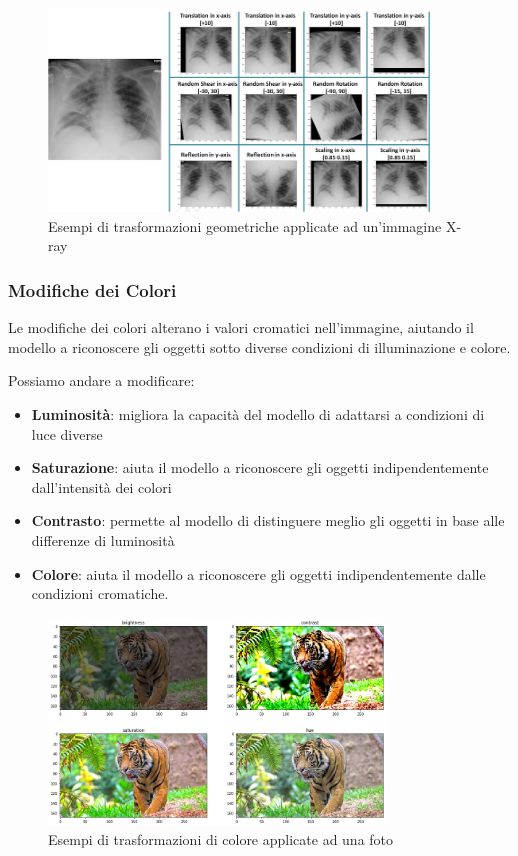 \begin{figure}[ht]
    \centering
    \includegraphics[width=0.9\textwidth]{files/capitoli/3-data-augmentation/assets/geometric-transformations.png}
    \caption{\label{fig:geometric-transformations}Esempi di trasformazioni geometriche applicate ad un'immagine X-ray\cite{34}}
\end{figure}

\subsubsection{Modifiche dei Colori}
Le modifiche dei colori alterano i valori cromatici nell'immagine, aiutando il modello a riconoscere gli oggetti sotto diverse condizioni di illuminazione e colore.

Possiamo andare a modificare:
\begin{itemize}
  \item \textbf{Luminosità}: migliora la capacità del modello di adattarsi a condizioni di luce diverse
  \item \textbf{Saturazione}: aiuta il modello a riconoscere gli oggetti indipendentemente dall'intensità dei colori
  \item \textbf{Contrasto}: permette al modello di distinguere meglio gli oggetti in base alle differenze di luminosità
  \item \textbf{Colore}: aiuta il modello a riconoscere gli oggetti indipendentemente dalle condizioni cromatiche.
\end{itemize}

\begin{figure}[ht]
    \centering
    \includegraphics[width=0.8\textwidth]{files/capitoli/3-data-augmentation/assets/color-transformations.png}
    \caption{\label{fig:color-transformations}Esempi di trasformazioni di colore applicate ad una foto\cite{35}}
\end{figure}

